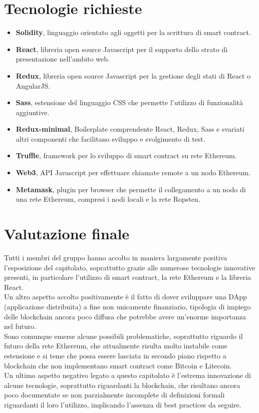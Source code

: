 \documentclass[StudioDiFattibilità.tex]{subfiles}
\begin{document}
\section{Tecnologie richieste}
\begin{itemize}
	\item \textbf{Solidity}, linguaggio orientato agli oggetti per la scrittura di smart contract.
	\item \textbf{React}, libreria open source Javascript per il supporto dello strato di presentazione nell'ambito web.
	\item \textbf{Redux}, libreria open source Javascript per la gestione degli stati di React o AngularJS.
	\item \textbf{Sass}, estensione del linguaggio CSS che permette l'utilizzo di funzionalità aggiuntive.
	\item \textbf{Redux-minimal}, Boilerplate comprendente React, Redux, Sass e svariati altri componenti che facilitano sviluppo e svolgimento di test.
	\item \textbf{Truffle}, framework per lo sviluppo di smart contract su rete Ethereum.
	\item \textbf{Web3}, API Javascript per effettuare chiamate remote a un nodo Ethereum.
	\item \textbf{Metamask}, plugin per browser che permette il collegamento a un nodo di una rete Ethereum, compresi i nodi locali e la rete Ropsten.
\end{itemize}
\section{Valutazione finale}
Tutti i membri del gruppo hanno accolto in maniera largamente positiva l'esposizione del capitolato, soprattutto grazie alle numerose tecnologie innovative presenti, in particolare l'utilizzo di smart contract, la rete Ethereum e la libreria React.\\
Un altro aspetto accolto positivamente è il fatto di dover sviluppare una DApp (applicazione distribuita) a fine non unicamente finanziario, tipologia di impiego delle blockchain ancora poco diffusa che potrebbe avere un'enorme importanza nel futuro.\\
Sono comunque emerse alcune possibili problematiche, soprattutto riguardo il futuro della rete Ethereum, che attualmente risulta molto instabile come estensione e si teme che possa essere lasciata in secondo piano rispetto a blockchain che non implementano smart contract come Bitcoin e Litecoin.\\
Un ultimo aspetto negativo legato a questo capitolato è l'estrema innovazione di alcune tecnologie, soprattutto riguardanti la blockchain, che risultano ancora poco documentate se non parzialmente incomplete di definizioni formali riguardanti il loro l'utilizzo, implicando l'assenza di best practices da seguire.
\end{document}
